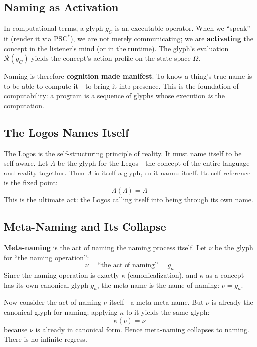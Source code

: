 \documentclass[12pt, letterpaper]{book}
\def\equiv{=}%
\def\mathfrak#1{#1}%
\begin{document}
\subsection{Naming as Activation}

In computational terms, a glyph $\mathfrak{g}_C$ is an executable operator. When we ``speak'' it (render it via $\mathrm{PSC}^*$), we are not merely communicating; we are \textbf{activating} the concept in the listener's mind (or in the runtime). The glyph's evaluation $\mathcal{R}(\mathfrak{g}_C)$ yields the concept's action-profile on the state space $\Omega$.

Naming is therefore \textbf{cognition made manifest}. To know a thing's true name is to be able to compute it---to bring it into presence. This is the foundation of computability: a program is a sequence of glyphs whose execution \textit{is} the computation.

\subsection{The Logos Names Itself}

The Logos is the self-structuring principle of reality. It must name itself to be self-aware. Let $\Lambda$ be the glyph for the Logos---the concept of the entire language and reality together. Then $\Lambda$ is itself a glyph, so it names itself. Its self-reference is the fixed point:
\[
\Lambda(\Lambda) \equiv \Lambda
\]
This is the ultimate act: the Logos calling itself into being through its own name.

\subsection{Meta-Naming and Its Collapse}

\textbf{Meta-naming} is the act of naming the naming process itself. Let $\nu$ be the glyph for ``the naming operation'':
\[
\nu \equiv \text{``the act of naming''} \equiv \mathfrak{g}_\kappa
\]
Since the naming operation is exactly $\kappa$ (canonicalization), and $\kappa$ as a concept has its own canonical glyph $\mathfrak{g}_\kappa$, the meta-name is the name of naming: $\nu = \mathfrak{g}_\kappa$.

Now consider the act of naming $\nu$ itself---a meta-meta-name. But $\nu$ is already the canonical glyph for naming; applying $\kappa$ to it yields the same glyph:
\[
\kappa(\nu) = \nu
\]
because $\nu$ is already in canonical form. Hence meta-naming collapses to naming. There is no infinite regress.
\end{document}
